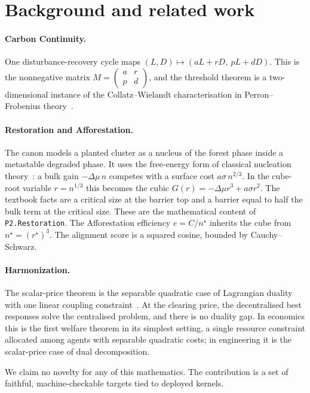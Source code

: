 \documentclass[11pt]{article}
\theoremstyle{definition}
\theoremstyle{remark}
\begin{document}
\section{Background and related work}
\paragraph{Carbon Continuity.} One disturbance-recovery cycle maps $(L,D)\mapsto(aL+rD,\ pL+dD)$.
This is the nonnegative matrix $M=\begin{pmatrix}a&r\\p&d\end{pmatrix}$, and the threshold theorem is a
two-dimensional instance of the Collatz--Wielandt characterisation in Perron--Frobenius theory~\cite{BermanPlemmons1994}.

\paragraph{Restoration and Afforestation.} The canon models a planted cluster as a nucleus of the forest phase inside a
metastable degraded phase. It uses the free-energy form of classical nucleation theory~\cite{Kashchiev2000}:
a bulk gain $-\Delta\mu\, n$ competes with a surface cost $a\sigma\, n^{2/3}$.
In the cube-root variable $r=n^{1/3}$ this becomes the cubic $G(r)=-\Delta\mu r^3+a\sigma r^2$.
The textbook facts are a critical size at the barrier top and a barrier equal to half the bulk term at the critical size.
These are the mathematical content of \texttt{P2.Restoration}.
The Afforestation efficiency $e=C/n^\star$ inherits the cube from $n^\star=(r^\star)^3$.
The alignment score is a squared cosine, bounded by Cauchy--Schwarz.

\paragraph{Harmonization.} The scalar-price theorem is the separable quadratic case of Lagrangian duality with
one linear coupling constraint~\cite{BoydVandenberghe2004}.
At the clearing price, the decentralised best responses solve the centralised problem, and there is no duality gap.
In economics this is the first welfare theorem in its simplest setting, a single resource constraint allocated among
agents with separable quadratic costs; in engineering it is the scalar-price case of dual decomposition.

We claim no novelty for any of this mathematics. The contribution is a set of faithful, machine-checkable targets tied
to deployed kernels.
\end{document}
